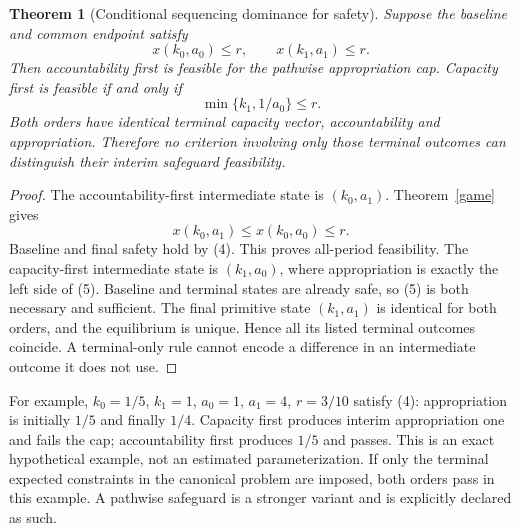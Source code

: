\documentclass[11pt]{article}
\newtheorem{theorem}{Theorem}
\begin{document}
\begin{theorem}[Conditional sequencing dominance for safety]\label{sequence}
Suppose the baseline and common endpoint satisfy
\[
 x(k_0,a_0)\leq r,
 \qquad x(k_1,a_1)\leq r.                                    \tag{4}
\]
Then accountability first is feasible for the pathwise appropriation cap.
Capacity first is feasible if and only if
\[
 \min\{k_1,1/a_0\}\leq r.                                   \tag{5}
\]
Both orders have identical terminal capacity vector, accountability and
appropriation. Therefore no criterion involving only those terminal
outcomes can distinguish their interim safeguard feasibility.
\end{theorem}
\begin{proof}
The accountability-first intermediate state is $(k_0,a_1)$.
Theorem~\ref{game} gives
\[x(k_0,a_1)\leq x(k_0,a_0)\leq r.\]
Baseline and final safety hold by (4). This proves all-period feasibility.
The capacity-first intermediate state is $(k_1,a_0)$, where appropriation
is exactly the left side of (5). Baseline and terminal states are already
safe, so (5) is both necessary and sufficient. The final primitive state
$(k_1,a_1)$ is identical for both orders, and the equilibrium is unique.
Hence all its listed terminal outcomes coincide. A terminal-only rule
cannot encode a difference in an intermediate outcome it does not use.
\end{proof}
For example, $k_0=1/5$, $k_1=1$, $a_0=1$, $a_1=4$, $r=3/10$ satisfy
(4): appropriation is initially $1/5$ and finally $1/4$.
Capacity first produces interim appropriation one and fails the cap;
accountability first produces $1/5$ and passes. This is an exact
hypothetical example, not an estimated parameterization. If only the
terminal expected constraints in the canonical problem are imposed,
both orders pass in this example. A pathwise safeguard is a stronger
variant and is explicitly declared as such.
\end{document}
